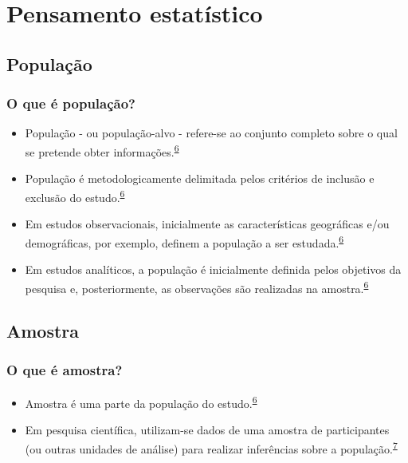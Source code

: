 \documentclass[
  a4paper,
]{book}
\begin{document}
\hypertarget{pensamento-estatistico}{%
\chapter{\texorpdfstring{\textbf{Pensamento estatístico}}{Pensamento estatístico}}\label{pensamento-estatistico}}

\hypertarget{populacao}{%
\section{População}\label{populacao}}

\hypertarget{o-que-uxe9-populauxe7uxe3o}{%
\subsection{O que é população?}\label{o-que-uxe9-populauxe7uxe3o}}

\begin{itemize}
\item
  População - ou população-alvo - refere-se ao conjunto completo sobre o qual se pretende obter informações.\textsuperscript{\protect\hyperlink{ref-Banerjee2010}{6}}
\item
  População é metodologicamente delimitada pelos critérios de inclusão e exclusão do estudo.\textsuperscript{\protect\hyperlink{ref-Banerjee2010}{6}}
\item
  Em estudos observacionais, inicialmente as características geográficas e/ou demográficas, por exemplo, definem a população a ser estudada.\textsuperscript{\protect\hyperlink{ref-Banerjee2010}{6}}
\item
  Em estudos analíticos, a população é inicialmente definida pelos objetivos da pesquisa e, posteriormente, as observações são realizadas na amostra.\textsuperscript{\protect\hyperlink{ref-Banerjee2010}{6}}
\end{itemize}

\hypertarget{amostra}{%
\section{Amostra}\label{amostra}}

\hypertarget{o-que-uxe9-amostra}{%
\subsection{O que é amostra?}\label{o-que-uxe9-amostra}}

\begin{itemize}
\item
  Amostra é uma parte da população do estudo.\textsuperscript{\protect\hyperlink{ref-Banerjee2010}{6}}
\item
  Em pesquisa científica, utilizam-se dados de uma amostra de participantes (ou outras unidades de análise) para realizar inferências sobre a população.\textsuperscript{\protect\hyperlink{ref-Bland2015}{7}}
\end{itemize}
\end{document}
